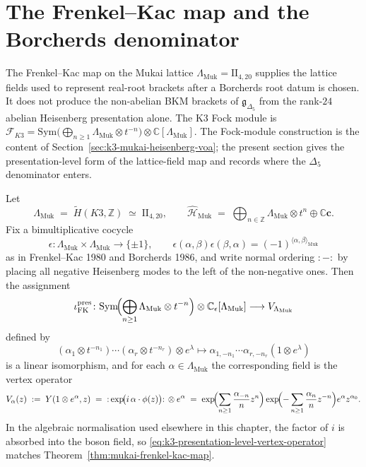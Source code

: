 \section{The Frenkel--Kac map and the Borcherds denominator}
\label{sec:k3-frenkel-kac-map-closure}

The Frenkel--Kac map on the Mukai lattice
$\Lambda_{\mathrm{Muk}} = \mathrm{II}_{4,20}$ supplies the lattice fields
used to represent real-root brackets after a Borcherds root datum is
chosen. It does not produce the non-abelian BKM brackets of
$\mathfrak{g}_{\Delta_5}$ from the rank-$24$ abelian Heisenberg
presentation alone. The K3 Fock module is
$\mathcal{F}_{K3} = \mathrm{Sym}\!\bigl(\bigoplus_{n\geq 1}\Lambda_{\mathrm{Muk}}\otimes t^{-n}\bigr)
\otimes \mathbb{C}[\Lambda_{\mathrm{Muk}}]$. The Fock-module construction
is the content of Section~\ref{sec:k3-mukai-heisenberg-voa}; the present
section gives the presentation-level form of the lattice-field map and
records where the $\Delta_5$ denominator enters.

\begin{theorem}
\label{thm:k3-presentation-frenkel-kac-map}
Let
\[
 \Lambda_{\mathrm{Muk}}
 \;=\;
 \widetilde{H}(K3,\mathbb{Z})
 \;\simeq\;
 \mathrm{II}_{4,20},
 \qquad
 \widehat{\mathcal{H}}_{\mathrm{Muk}}
 \;=\;
 \bigoplus_{n\in\mathbb{Z}}\Lambda_{\mathrm{Muk}}\otimes t^n
 \oplus \mathbb{C}\mathbf{c}.
\]
Fix a bimultiplicative cocycle
\[
 \epsilon\colon
 \Lambda_{\mathrm{Muk}}\times\Lambda_{\mathrm{Muk}}
 \longrightarrow
 \{\pm 1\},
 \qquad
 \epsilon(\alpha,\beta)\epsilon(\beta,\alpha)
 =
 (-1)^{\langle\alpha,\beta\rangle_{\mathrm{Muk}}}
\]
as in Frenkel--Kac 1980 and Borcherds 1986, and write normal ordering
$:{-}:$ by placing all negative Heisenberg modes to the left of the non-negative
ones. Then the assignment
\[
 \iota_{\mathrm{FK}}^{\mathrm{pres}}\colon
 \mathrm{Sym}\!\Bigl(\bigoplus_{n\geq 1}\Lambda_{\mathrm{Muk}}\otimes t^{-n}\Bigr)
 \otimes \mathbb{C}_\epsilon[\Lambda_{\mathrm{Muk}}]
 \longrightarrow
 V_{\Lambda_{\mathrm{Muk}}}
\]
defined by
\[
 (\alpha_1\otimes t^{-n_1})\cdots(\alpha_r\otimes t^{-n_r})\otimes e^\lambda
 \longmapsto
 \alpha_{1,-n_1}\cdots\alpha_{r,-n_r}(1\otimes e^\lambda)
\]
is a linear isomorphism, and for each $\alpha\in\Lambda_{\mathrm{Muk}}$ the
corresponding field is the vertex operator
\begin{equation}
\label{eq:k3-presentation-level-vertex-operator}
 V_\alpha(z)
 \;:=\;
 Y(1\otimes e^\alpha,z)
 \;=\;
 {:}\exp\!\bigl(i\,\alpha\cdot\phi(z)\bigr){:}\,\otimes e^\alpha
 \;=\;
 \exp\!\Bigl(\sum_{n\geq 1}\frac{\alpha_{-n}}{n}z^n\Bigr)
 \exp\!\Bigl(-\sum_{n\geq 1}\frac{\alpha_n}{n}z^{-n}\Bigr)
 e^\alpha z^{\alpha_0}.
\end{equation}
In the algebraic normalisation used elsewhere in this chapter, the factor of $i$ is
absorbed into the boson field, so \eqref{eq:k3-presentation-level-vertex-operator}
matches Theorem~\ref{thm:mukai-frenkel-kac-map}.
\end{theorem}

